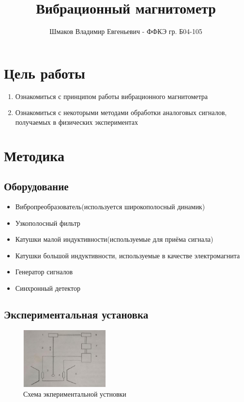 \documentclass[a4paper, 12pt]{extarticle}
\title{\textcolor{main_title}{Вибрационный магнитометр}}
\author{Шмаков Владимир Евгеньевич - ФФКЭ гр. Б04-105}
\begin{document}
\maketitle



\section*{\textcolor{header}{Цель работы}}

\begin{enumerate}
    \item Ознакомиться с принципом работы вибрационного магнитометра
    \item Ознакомиться с некоторыми методами обработки аналоговых сигналов, получаемых в физических экспериментах 
\end{enumerate}


\section*{\textcolor{header}{Методика}}
\subsection*{\textcolor{sub_header}{Оборудование}}

\begin{itemize}
    \item Вибропреобразователь(используется широкополосный динамик)
    \item Узкополосный фильтр
    \item Катушки малой индуктивности(используемые для приёма сигнала)
    \item Катушки большой индуктивности, используемые в качестве электромагнита
    \item Генератор сигналов 
    \item Синхронный детектор
\end{itemize}

\subsection*{\textcolor{sub_header}{Экспериментальная установка}}

\begin{figure}[htbp]
    \centering
    \includegraphics[width = 0.4\textwidth]{ustanovka.png}
    \caption{Схема экпериментальной устновки}
    \label{fig:setup}
\end{figure}
\end{document}
